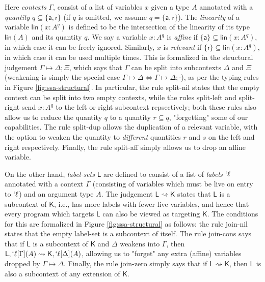 \documentclass[acmsmall,screen,review]{acmart}
\newcommand{\ms}[1]{\ensuremath{\mathsf{#1}}}
\newcommand{\lbl}[1]{{`#1}}
\newcommand{\csplits}[3]{#1 \mapsto #2;#3}
\newcommand{\cwk}[2]{#1 \mapsto #2}
\newcommand{\lwk}[2]{#1 \rightsquigarrow #2}
\newcommand{\tlin}[2]{#2 \subseteq \ms{lin}(#1)}
\newcommand{\thyp}[3]{#1: {#2}^{#3}}
\newcommand{\lhyp}[3]{#1[#2](#3)}
\newcommand{\llhyp}[3]{\lhyp{\lbl{#1}}{#2}{#3}}
\newcommand{\rle}[1]{{\scriptsize\textsf{#1}}}
\newcommand{\taff}{{\{\ms{a}\}}}
\newcommand{\trel}{{\{\ms{r}\}}}
\newcommand{\tint}{{\{\ms{a}, \ms{r}\}}}
\begin{document}
Here \textit{contexts} \(\Gamma\), consist of a list of variables \(x\) given a
type \(A\) annotated with a \textit{quantity} \(q \subseteq \tint\) (if \(q\) is
omitted, we assume \(q = \tint\)). The \textit{linearity} of a variable
\(\ms{lin}(\thyp{x}{A}{q})\) is defined to be the intersection of the linearity
of its type \(\ms{lin}(A)\) and its quantity \(q\). We say a variable \(x: A^q\)
is \textit{affine} if \(\tlin{\thyp{x}{A}{q}}{\taff}\), in which case it can be
freely ignored. Similarly, \(x\) is \textit{relevant} if
\(\tlin{\thyp{x}{A}{q}}{\trel}\), in which case it can be used multiple times.
This is formalized in the structural judgement
\(\csplits{\Gamma}{\Delta}{\Xi}\), which says that \(\Gamma\) can be split into
subcontexts \(\Delta\) and \(\Xi\) (weakening is simply the special case
\(\cwk{\Gamma}{\Delta} \iff \csplits{\Gamma}{\Delta}{\cdot}\)), as per the
typing rules in Figure \ref{fig:ssa-structural}. In particular, the rule
\rle{split-nil} states that the empty context can be split into two empty
contexts, while the rules \rle{split-left} and \rle{split-right} send \(x: A^q\)
to the left or right subcontext repsectively; both these rules also allow us to
reduce the quantity \(q\) to a quantity \(r \subseteq q\), "forgetting" some of
our capabilities. The rule \rle{split-dup} allows the duplication of a relevant
variable, with the option to weaken the quantity to \textit{different}
quantities \(r\) and \(s\) on the left and right respectively. Finally, the rule
\rle{split-aff} simply allows us to drop an affine variable.

On the other hand, \textit{label-sets} \(\ms{L}\) are defined to consist of a
list of \textit{labels} \(\lbl{\ell}\) annotated with a context \(\Gamma\)
(consisting of variables which must be live on entry to \(\lbl{\ell}\)) and an
argument type \(A\). The judgement \(\lwk{\ms{L}}{\ms{K}}\) states that
\(\ms{L}\) is a subcontext of \(\ms{K}\), i.e., has more labels with fewer live
variables, and hence that every program which targets \(\ms{L}\) can also be
viewed as targeting \(\ms{K}\). The conditions for this are formalized in Figure
\ref{fig:ssa-structural} as follows: the rule \rle{join-nil} states that the
empty label-set is a subcontext of itself. The rule \rle{join-cons} says that if
\(\ms{L}\) is a subcontext of \(\ms{K}\) and \(\Delta\) weakens into \(\Gamma\),
then \(\lwk{\ms{L}, \llhyp{\ell}{\Gamma}{A}}{\ms{K}, \llhyp{\ell}{\Delta}{A}}\),
allowing us to "forget" any extra (affine) variables dropped by
\(\cwk{\Gamma}{\Delta}\). Finally, the rule \rle{join-zero} simply says that if
\(\lwk{\ms{L}}{\ms{K}}\), then \(\ms{L}\) is also a subcontext of any extension
of \(\ms{K}\). 
\end{document}
